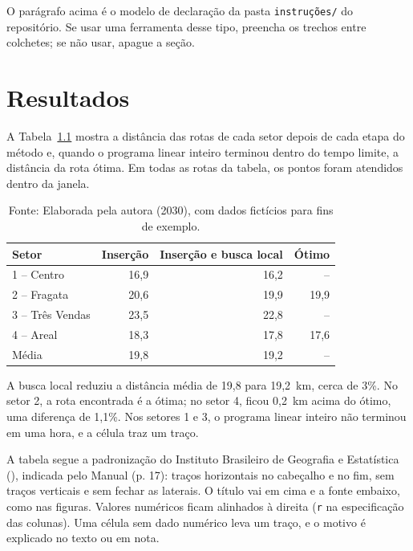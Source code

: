 \documentclass[tese,capa]{texufpel}
\begin{document}
O parágrafo acima é o modelo de declaração da pasta \texttt{instruções/} do
repositório. Se usar uma ferramenta desse tipo, preencha os trechos entre
colchetes; se não usar, apague a seção.

\chapter{Resultados}
\label{cap:resultados}

A Tabela~\ref{tab:resultados} mostra a distância das rotas de cada setor
depois de cada etapa do método e, quando o programa linear inteiro terminou
dentro do tempo limite, a distância da rota ótima. Em todas as rotas da
tabela, os pontos foram atendidos dentro da janela.

\begin{table}[htbp]
  \caption{Distância das rotas por setor, em quilômetros}
  \label{tab:resultados}
  \centering
  \begin{tabular}{lrrr}
    \hline
    Setor            & Inserção & Inserção e busca local & Ótimo \\
    \hline
    1 -- Centro      & 16,9 & 16,2 & -- \\
    2 -- Fragata     & 20,6 & 19,9 & 19,9 \\
    3 -- Três Vendas & 23,5 & 22,8 & -- \\
    4 -- Areal       & 18,3 & 17,8 & 17,6 \\
    \hline
    Média            & 19,8 & 19,2 & -- \\
    \hline
  \end{tabular}
  \caption*{Fonte: Elaborada pela autora (2030), com dados fictícios para fins
  de exemplo.}
\end{table}

A busca local reduziu a distância média de 19,8 para 19,2~km, cerca de 3\%.
No setor 2, a rota encontrada é a ótima; no setor 4, ficou 0,2~km acima do
ótimo, uma diferença de 1,1\%. Nos setores 1 e 3, o programa linear inteiro
não terminou em uma hora, e a célula traz um traço.

A tabela segue a padronização do Instituto Brasileiro de Geografia e
Estatística (),
indicada pelo Manual (p. 17): traços horizontais no cabeçalho e no fim, sem
traços verticais e sem fechar as laterais. O título vai em cima e a fonte
embaixo, como nas figuras. Valores numéricos ficam alinhados à direita
(\texttt{r} na especificação das colunas). Uma célula sem dado numérico leva
um traço, e o motivo é explicado no texto ou em nota.
\end{document}
